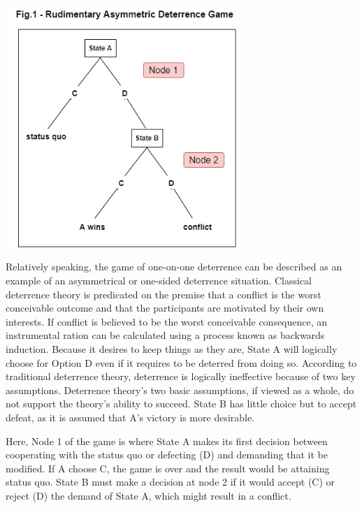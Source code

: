 \documentclass[runningheads]{llncs}
\begin{document}
\begin{center}
    \includegraphics[width=9cm]{Asymmetric_deterrance_game.png}
\end{center}

Relatively speaking, the game of one-on-one deterrence can be described as an example of an asymmetrical or one-sided deterrence situation. Classical deterrence theory is predicated on the premise that a conflict is the worst conceivable outcome and that the participants are motivated by their own interests.
If conflict is believed to be the worst conceivable consequence, an instrumental ration can be calculated using a process known as backwards induction. Because it desires to keep things as they are, State A will logically choose for Option D even if it requires to be deterred from doing so. According to traditional deterrence theory, deterrence is logically ineffective because of two key assumptions. Deterrence theory's two basic assumptions, if viewed as a whole, do not support the theory's ability to succeed. State B has little choice but to accept defeat, as it is assumed that A's victory is more desirable.

Here, Node 1 of the game is where State A makes its first decision between cooperating with the status quo or defecting (D) and demanding that it be modified. If A choose C, the game is over and the result would be attaining status quo. State B must make a decision at node 2 if it would accept (C) or reject (D) the demand of State A, which might result in a conflict.

\newpage
\end{document}
